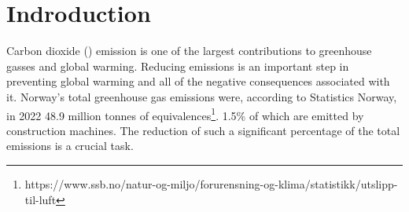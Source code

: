 \documentclass[conference]{IEEEtran}
\begin{document}
\begin{abstract}
\coo{} gas is one of the major contributors to greenhouse gases. Reducing greenhouse gases is an essential
task in reducing the environmental impacts of global warming. From extreme weather to the ruin of ecosystems
and mass extinctions, it is clear that global warming, caused by greenhouse gases, is a major existential issue.
In Norway, 1.5\% of the total \coo{} emissions come from construction machines. Given the total greenhouse gas
emissions adding up to almost 50 million metric tonnes of \coo{} equivalences, a reduction in emissions from
construction machines will lead to a significant reduction in the country's total emissions.

Although there have been studies conducted that use Reinforcement Learning techniques to reduce emissions by
optimizing routes and scheduling, our attempt in this paper is to extend this to the use of Multi-Agent
Reinforcement Learning techniques. The field of Multi-Agent Reinforcement Learning has gained more and more
applications.

This paper demonstrates implementations of Multi-Agent versions of two well-tested Reinforcement Learning
methods: Proximal Policy Optimization and Deep Q-Networks. This paper shows the promising results of how 
Multi-Agent Reinforcement Learning could be used to reduce \coo{} emissions, but it also highlights many ways in
which these methods can be improved.


Index Terms - Multi-Agent Reinforcement Learning (MARL),
\end{abstract}


\section{Indroduction}
Carbon dioxide (\coo{}) emission is one of the largest contributions to greenhouse gasses and global warming.
Reducing \coo{} emissions is an important step in preventing global warming and all of the negative
consequences associated with it. Norway's total greenhouse gas emissions were, according to Statistics
Norway, in 2022 48.9 million tonnes of \coo{}
equivalences\footnote{https://www.ssb.no/natur-og-miljo/forurensning-og-klima/statistikk/utslipp-til-luft}.
1.5\% of which are emitted by construction machines. \cite{noraRoadAIReducing} The reduction of such
a significant percentage of the total emissions is a crucial task.
\end{document}

